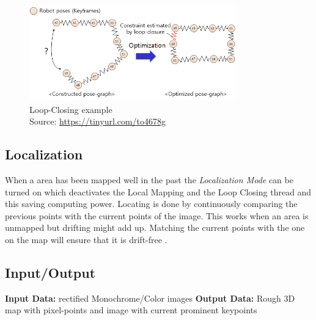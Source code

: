 \begin{figure}[h!]
	\centering
	\includegraphics[width=0.8\textwidth]{./media/images/loopclosing.PNG}
  	\caption{Loop-Closing example
  	\\Source: \url{https://tinyurl.com/to4678g}}
  	\label{img:loopclosing}
\end{figure}

\subsection {Localization}
When a area has been mapped well in the past the \textit{Localization Mode} can be turned on which deactivates the Local Mapping and the Loop Closing thread and this saving computing power.
Locating is done by continuously comparing the previous points with the current points of the image. This works when an area is unmapped but drifting might add up.
Matching the current points with the one on the map will ensure that it is drift-free \cite{orbslam2}.

\subsection{Input/Output}
\textbf{Input Data:} rectified Monochrome/Color images\newline
\textbf{Output Data:} Rough 3D map with pixel-points and image with current prominent keypoints
